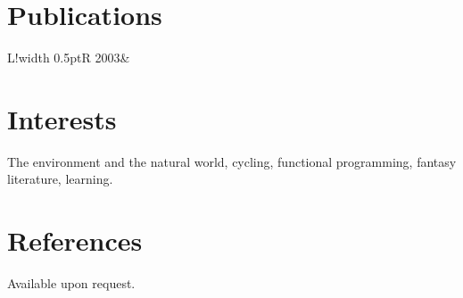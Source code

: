 \documentclass[11pt,a4paper]{article}
\newcommand\VRule{\color{lightgray}\vrule width 0.5pt}
\begin{document}


\section*{Publications}
\begin{longtable}{L!{\VRule}R}
2003&
\end{longtable}

\section*{Interests}
The environment and the natural world, cycling, functional programming, fantasy literature, learning.

\section*{References}
Available upon request.
\end{document}
